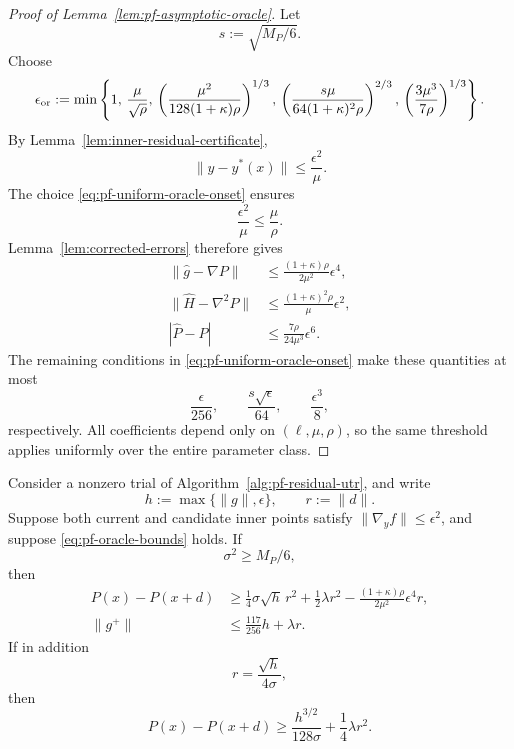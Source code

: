 \begin{proof}[Proof of Lemma~\ref{lem:pf-asymptotic-oracle}]
Let
\[
    s:=\sqrt{M_P/6}.
\]
Choose
\begin{equation}
    \epsilon_{\rm or}
    :=
    \min\left\{
        1,\,
        \frac{\mu}{\sqrt\rho},\,
        \left(
            \frac{\mu^2}{
                128(1+\kappa)\rho
            }
        \right)^{1/3},\,
        \left(
            \frac{
                s\mu
            }{
                64(1+\kappa)^2\rho
            }
        \right)^{2/3},\,
        \left(
            \frac{
                3\mu^3
            }{
                7\rho
            }
        \right)^{1/3}
    \right\}.
    \label{eq:pf-uniform-oracle-onset}
\end{equation}
By Lemma~\ref{lem:inner-residual-certificate},
\[
    \|y-y^*(x)\|
    \le
    \frac{\epsilon^2}{\mu}.
\]
The choice \eqref{eq:pf-uniform-oracle-onset} ensures
\[
    \frac{\epsilon^2}{\mu}
    \le
    \frac{\mu}{\rho}.
\]
Lemma~\ref{lem:corrected-errors} therefore gives
\begin{align*}
    \|\widehat g-\nabla P\|
    &\le
    \frac{(1+\kappa)\rho}{2\mu^2}\epsilon^4,
    \\
    \|\widehat H-\nabla^2P\|
    &\le
    \frac{(1+\kappa)^2\rho}{\mu}\epsilon^2,
    \\
    |\widehat P-P|
    &\le
    \frac{7\rho}{24\mu^3}\epsilon^6.
\end{align*}
The remaining conditions in
\eqref{eq:pf-uniform-oracle-onset} make these quantities at most
\[
    \frac{\epsilon}{256},
    \qquad
    \frac{s\sqrt\epsilon}{64},
    \qquad
    \frac{\epsilon^3}{8},
\]
respectively.
All coefficients depend only on $(\ell,\mu,\rho)$, so the same
threshold applies uniformly over the entire parameter class.
\end{proof}


\begin{lemma}
\label{lem:pf-safe-trial}
Consider a nonzero trial of
Algorithm~\ref{alg:pf-residual-utr}, and write
\[
    h:=\max\{\|g\|,\epsilon\},
    \qquad
    r:=\|d\|.
\]
Suppose both current and candidate inner points satisfy
$\|\nabla_yf\|\le\epsilon^2$, and suppose
\eqref{eq:pf-oracle-bounds} holds.
If
\[
    \sigma^2\ge M_P/6,
\]
then
\begin{subequations}
\begin{align}
    P(x)-P(x+d)
    &\ge
    \frac14\sigma\sqrt h\,r^2
    +
    \frac12\lambda r^2
    -
    \frac{(1+\kappa)\rho}{2\mu^2}
    \epsilon^4r,
    \label{eq:pf-safe-decrease}
    \\
    \|g^+\|
    &\le
    \frac{117}{256}h+\lambda r.
    \label{eq:pf-safe-gradient}
\end{align}
\end{subequations}
If in addition
\[
    r=\frac{\sqrt h}{4\sigma},
\]
then
\begin{equation}
    P(x)-P(x+d)
    \ge
    \frac{h^{3/2}}{128\sigma}
    +
    \frac14\lambda r^2.
    \label{eq:pf-safe-boundary-decrease}
\end{equation}
\end{lemma}

